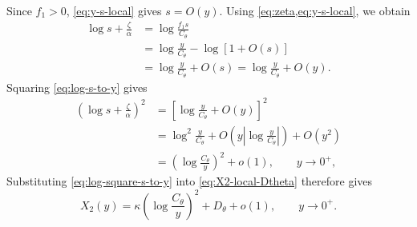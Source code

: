 \documentclass[11pt]{article}
\newcommand{\Cth}{C_\theta}
\newcommand{\Dth}{D_\theta}
\begin{document}
Since \(f_1>0\), \cref{eq:y-s-local} gives \(s=O(y)\). Using \cref{eq:zeta,eq:y-s-local}, we obtain
\begin{equation}
\begin{aligned}
\log s+\frac{\zeta}{\alpha}
&=\log\frac{f_1s}{\Cth}\\
&=\log\frac{y}{\Cth}-\log\left[1+O(s)\right]\\
&=\log\frac{y}{\Cth}+O(s)
=\log\frac{y}{\Cth}+O(y).
\end{aligned}
\label{eq:log-s-to-y}
\end{equation}
Squaring \cref{eq:log-s-to-y} gives
\begin{equation}
\begin{aligned}
\left(\log s+\frac{\zeta}{\alpha}\right)^2
&=\left[\log\frac{y}{\Cth}+O(y)\right]^2\\
&=\log^2\frac{y}{\Cth}
+O\left(y\left|\log\frac{y}{\Cth}\right|\right)+O(y^2)\\
&=\left(\log\frac{\Cth}{y}\right)^2+o(1),
\qquad y\to0^+,
\end{aligned}
\label{eq:log-square-s-to-y}
\end{equation}
Substituting \cref{eq:log-square-s-to-y} into \cref{eq:X2-local-Dtheta} therefore gives
\begin{equation}
X_2(y)=\kappa\left(\log\frac{\Cth}{y}\right)^2+\Dth+o(1),
\qquad y\to0^+.
\label{eq:X2asymp}
\end{equation}
\end{document}
